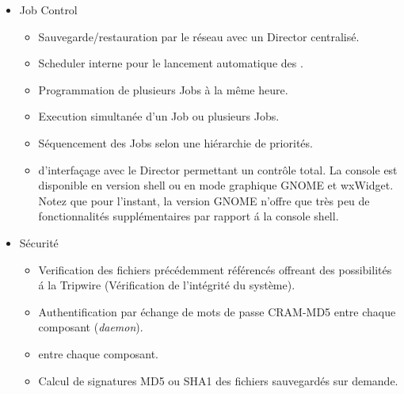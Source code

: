 \begin{itemize}
\item Job Control
   \begin{itemize}
     \item Sauvegarde/restauration par le r\'eseau avec un Director centralis\'e.  
     \item Scheduler interne pour le lancement automatique des 
     .  
     \item Programmation de plusieurs Jobs \`a la m\^eme heure.  
     \item Execution simultan\'ee d'un Job ou plusieurs Jobs.  
     \item S\'equencement des Jobs selon  une hi\'erarchie de priorit\'es.  
     \item {} d'interfa\c{c}age avec le Director  permettant un
     contr\^ole total. La console est disponible en version shell ou en mode graphique GNOME et wxWidget.
      Notez que pour l'instant, la version GNOME n'offre que tr\`es peu de fonctionnalit\'es 
      suppl\'ementaires par rapport \'a la console shell.   
   \end{itemize}

   \item S\'ecurit\'e
   \begin{itemize}
     \item Verification des fichiers pr\'ec\'edemment r\'ef\'erenc\'es offreant des possibilit\'es \'a la Tripwire 
      (V\'erification de l'int\'egrit\'e du syst\`eme).
     \item Authentification par \'echange de mots de passe CRAM-MD5 entre chaque composant ({\it daemon}). 
     \item {} entre chaque composant. 
     \item Calcul de signatures MD5 ou SHA1 des fichiers sauvegard\'es sur demande.
   \end{itemize}



\end{itemize}
